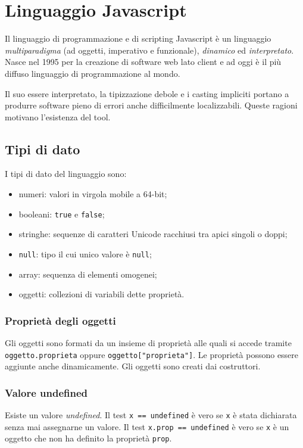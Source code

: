 \chapter{Linguaggio Javascript}

Il linguaggio di programmazione e di scripting Javascript è un linguaggio \emph{multiparadigma} (ad oggetti, imperativo e funzionale), \emph{dinamico} ed \emph{interpretato}. Nasce nel 1995 per la creazione di software web lato client e ad oggi è il più diffuso linguaggio di programmazione al mondo.

Il suo essere interpretato, la tipizzazione debole e i casting impliciti portano a produrre software pieno di errori anche difficilmente localizzabili. Queste ragioni motivano l'esistenza del tool. 

\section{Tipi di dato}

I tipi di dato del linguaggio sono:
\begin{itemize}
    \item numeri: valori in virgola mobile a 64-bit;
    \item booleani: \texttt{true} e \texttt{false};
    \item stringhe: sequenze di caratteri Unicode racchiusi tra apici singoli o doppi;
    \item \texttt{null}: tipo il cui unico valore è \texttt{null};
    \item array: sequenza di elementi omogenei;
    \item oggetti: collezioni di variabili dette proprietà.
\end{itemize}

\subsection{Proprietà degli oggetti}

Gli oggetti sono formati da un insieme di proprietà alle quali si accede tramite \texttt{oggetto.proprieta} oppure \texttt{oggetto["proprieta"]}. Le proprietà possono essere aggiunte anche dinamicamente. Gli oggetti sono creati dai costruttori.

\subsection{Valore undefined}

Esiste un valore \emph{undefined}. Il test \texttt{x == undefined} è vero se \texttt{x} è stata dichiarata senza mai assegnarne un valore. Il test \texttt{x.prop == undefined} è vero se \texttt{x} è un oggetto che non ha definito la proprietà \texttt{prop}.

